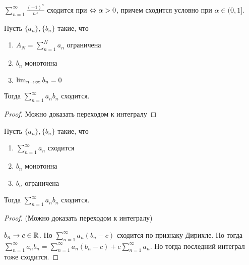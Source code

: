 
\begin{example}
    \(\sum_{n = 1}^\infty \frac{(-1)^n}{n^\alpha}\) сходится при \(\Leftrightarrow \alpha > 0\), причем сходится условно при \(\alpha \in (0, 1]\).
\end{example}
\begin{theorem}
    Пусть \(\{a_n\}, \{b_n\}\) такие, что 
    \begin{enumerate}
        \item \(A_N = \sum_{n = 1}^Na_n\) ограничена
        \item \(b_n\) монотонна
        \item \(\lim_{n \rightarrow \infty} b_n = 0\)
    \end{enumerate}
    Тогда \(\sum_{n = 1}^\infty a_nb_n\) сходится.
\end{theorem}
\begin{proof}
    Можно доказать переходом к интегралу
\end{proof}

\begin{corollary}
    Пусть \(\{a_n\}, \{b_n\}\) такие, что 
    \begin{enumerate}
        \item \(\sum_{n = 1}^\infty a_n\) сходится
        \item \(b_n\) монотонна
        \item \(b_n\) ограничена
    \end{enumerate}
    Тогда \(\sum_{n = 1}^\infty a_nb_n\) сходится.
\end{corollary}
\begin{proof}
    (Можно доказать переходом к интегралу)

    \(b_n \rightarrow c \in \mathbb{R}\). Но \(\sum_{n = 1}^\infty a_n(b_n - c)\) сходится по признаку Дирихле. Но тогда \(\sum_{n = 1}^\infty a_nb_n = \sum_{n = 1}^\infty a_n(b_n - c) + c\sum_{n = 1}^\infty a_n\). Но тогда последний интеграл тоже сходится.
\end{proof}

